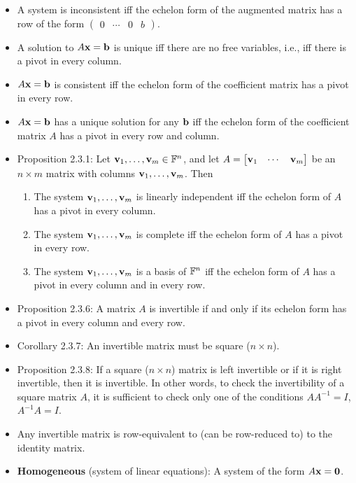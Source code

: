\documentclass[../../notes.tex]{subfiles}
\begin{document}
\begin{itemize}
    \item {}A system is inconsistent iff the echelon form of the augmented matrix has a row of the form $
        \begin{pmatrix}
            0 & \cdots & 0 & b
        \end{pmatrix}
    $.
    \item A solution to $A\mathbf{x}=\mathbf{b}$ is unique iff there are no free variables, i.e., iff there is a pivot in every column.
    \item $A\mathbf{x}=\mathbf{b}$ is consistent iff the echelon form of the coefficient matrix has a pivot in every row.
    \item $A\mathbf{x}=\mathbf{b}$ has a unique solution for any $\mathbf{b}$ iff the echelon form of the coefficient matrix $A$ has a pivot in every row and column.
    \item Proposition 2.3.1: Let $\mathbf{v}_1,\dots,\mathbf{v}_m\in\mathbb{F}^n$, and let $
        A =
        \begin{bmatrix}
            \mathbf{v}_1 & \cdots & \mathbf{v}_m
        \end{bmatrix}
    $ be an $n\times m$ matrix with columns $\mathbf{v}_1,\dots,\mathbf{v}_m$. Then
    \begin{enumerate}
        \item The system $\mathbf{v}_1,\dots,\mathbf{v}_m$ is linearly independent iff the echelon form of $A$ has a pivot in every column.
        \item The system $\mathbf{v}_1,\dots,\mathbf{v}_m$ is complete iff the echelon form of $A$ has a pivot in every row.
        \item The system $\mathbf{v}_1,\dots,\mathbf{v}_m$ is a basis of $\mathbb{F}^n$ iff the echelon form of $A$ has a pivot in every column and in every row.
    \end{enumerate}
    \item Proposition 2.3.6: A matrix $A$ is invertible if and only if its echelon form has a pivot in every column and every row.
    \item Corollary 2.3.7: An invertible matrix must be square ($n\times n$).
    \item Proposition 2.3.8: If a square ($n\times n$) matrix is left invertible or if it is right invertible, then it is invertible. In other words, to check the invertibility of a square matrix $A$, it is sufficient to check only one of the conditions $AA^{-1}=I$, $A^{-1}A=I$.
    \item Any invertible matrix is row-equivalent to (can be row-reduced to) to the identity matrix.
    \item \textbf{Homogeneous} (system of linear equations): A system of the form $A\mathbf{x}=\bm{0}$.

\end{itemize}
\end{document}
